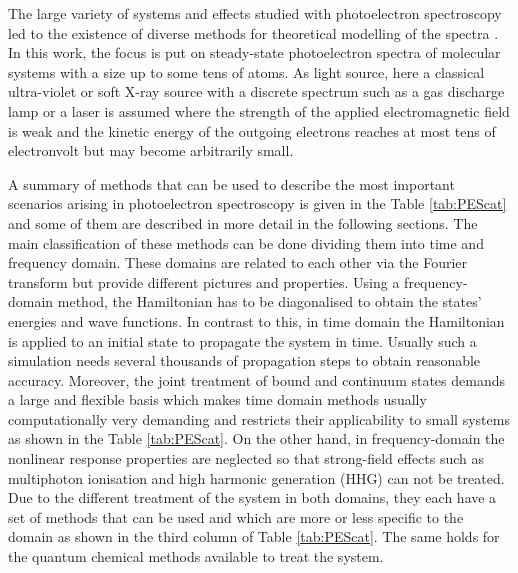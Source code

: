 \label{ch:calcPES}
The large variety of systems and effects studied with photoelectron spectroscopy led to the existence of diverse methods for theoretical modelling of the spectra \cite{PESbook, x-ray}.
In this work, the focus is put on steady-state photoelectron spectra of molecular systems with a size up to some tens of atoms.
As light source, here a classical ultra-violet or soft X-ray source with a discrete spectrum such as a gas discharge lamp or a laser is assumed where the strength of the applied electromagnetic field is weak and the kinetic energy of the outgoing electrons reaches at most tens of electronvolt but may become arbitrarily small.

A summary of methods that can be used to describe the most important scenarios arising in photoelectron spectroscopy is given in the Table \ref{tab:PEScat} and some of them are described in more detail in the following sections.
The main classification of these methods can be done dividing them into time and frequency domain.
These domains are related to each other via the Fourier transform but provide different pictures and properties.
Using a frequency-domain method, the Hamiltonian has to be diagonalised to obtain the states' energies and wave functions.
In contrast to this, in time domain the Hamiltonian is applied to an initial state to propagate the system in time.
Usually such a simulation needs several thousands of propagation steps to obtain reasonable accuracy.
Moreover, the joint treatment of bound and continuum states demands a large and flexible basis which makes time domain methods usually computationally very demanding and restricts their applicability to small systems as shown in the Table \ref{tab:PEScat}.
On the other hand, in frequency-domain the nonlinear response properties are neglected so that strong-field effects such as multiphoton ionisation and high harmonic generation (HHG) can not be treated.
Due to the different treatment of the system in both domains, they each have a set of methods that can be used and which are more or less specific to the domain as shown in the third column of Table \ref{tab:PEScat}.
The same holds for the quantum chemical methods available to treat the system.
